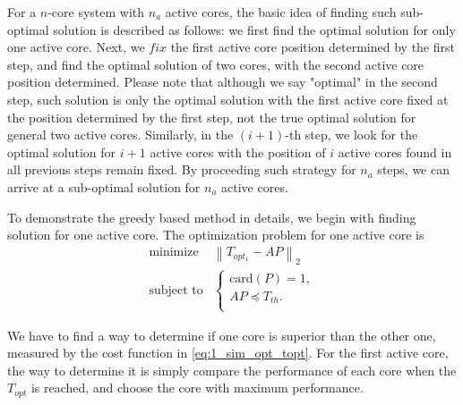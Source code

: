 For a $n$-core system with $n_{a}$ active cores, the basic idea of finding such sub-optimal solution is described as follows: we first find the optimal solution for only one active core. Next, we $fix$ the first active core position determined by the first step, and find the optimal solution of two cores, with the second active core position determined. Please note that although we say "optimal" in the second step, such solution is only the optimal solution with the first active core fixed at the position determined by the first step, not the true optimal solution for general two active cores. Similarly, in the $(i+1)$-th step, we look for the optimal solution for $i+1$ active cores with the position of $i$ active cores found in all previous steps remain fixed. By proceeding such strategy for $n_{a}$ steps, we can arrive at a sub-optimal solution for $n_{a}$ active cores.


To demonstrate the greedy based method in details, we begin with finding solution for one active core. The optimization problem for one active core is
\begin{equation}\label{eq:1_sim_opt_topt}
\begin{split}
\text{minimize } &  \left \| T_{opt_1} - AP \right \|_{2}\\
\text{subject to} &\left\{
\begin{array}{lr}
\text{card}(P) = 1,\\
AP \preceq T_{th}.\\
\end{array}
\right.
\end{split}
\end{equation}


We have to find a way to determine if one core is superior than the other one, measured by the cost function in \eqref{eq:1_sim_opt_topt}. For the first active core, the way to determine it is simply compare the performance of each core when the $T_{opt}$ is reached, and choose the core with maximum performance.

